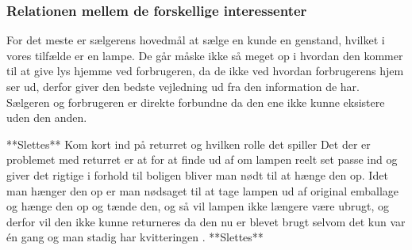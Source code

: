 \subsubsection{Relationen mellem de forskellige interessenter}
For det meste er sælgerens hovedmål at sælge en kunde en genstand, hvilket i vores tilfælde er en lampe. De går måske ikke så meget op i hvordan den kommer til at give lys hjemme ved forbrugeren, da de ikke ved hvordan forbrugerens hjem ser ud, derfor giver den bedste vejledning ud fra den information de har. Sælgeren og forbrugeren er direkte forbundne da den ene ikke kunne eksistere uden den anden. 

**Slettes**
Kom kort ind på returret og hvilken rolle det spiller
Det der er problemet med returret er at for at finde ud af om lampen reelt set passe ind og giver det rigtige i forhold til boligen bliver man nødt til at hænge den op. Idet man hænger den op er man nødsaget til at tage lampen ud af original emballage og hænge den op og tænde den, og så vil lampen ikke længere være ubrugt, og derfor vil den ikke kunne returneres da den nu er blevet brugt selvom det kun var én gang og man stadig har kvitteringen \cite{ikea_returret}.
**Slettes**